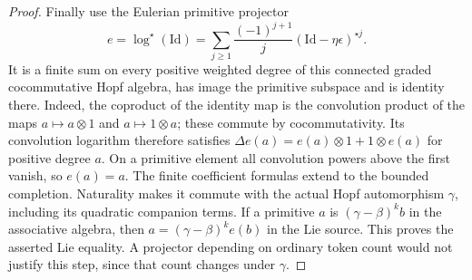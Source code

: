 \begin{proof}
Finally use the Eulerian primitive projector
\cite[Section~1.1, p.~2]{BandieraSchaetz}
\[
 e=\log^\star(\mathrm{Id})
   =\sum_{j\geq1}\frac{(-1)^{j+1}}j
             (\mathrm{Id}-\eta\epsilon)^{\star j}.
\]
It is a finite sum on every positive weighted degree
of this connected graded cocommutative Hopf algebra,
has image the primitive subspace and is identity
there. Indeed, the coproduct of the identity map is
the convolution product of the maps $a\mapsto a\otimes1$
and $a\mapsto1\otimes a$; these commute by cocommutativity.
Its convolution logarithm therefore satisfies
$\Delta e(a)=e(a)\otimes1+1\otimes e(a)$ for positive
degree $a$. On a primitive element all convolution
powers above the first vanish, so $e(a)=a$.
The finite coefficient formulas extend to the bounded
completion. Naturality makes it commute with the actual
Hopf automorphism $\gamma$, including its quadratic
companion terms. If a primitive $a$ is
$(\gamma-\beta)^k b$ in the associative algebra,
then $a=(\gamma-\beta)^k e(b)$ in the Lie source.
This proves the asserted Lie equality. A projector
depending on ordinary token count would not justify
this step, since that count changes under $\gamma$.
\end{proof}
